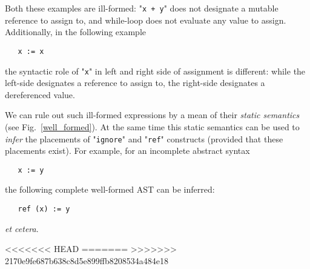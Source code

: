 \documentclass{article}
\newcommand{\llang}[1]{\mbox{\lstinline[mathescape]|#1|}}
\newcommand{\primi}[2]{\mathbf{#1}\;{#2}}
\theoremstyle{definition}
\begin{document}
Both these examples are ill-formed: "\llang{x + y}" does not designate a mutable reference to assign to, and while-loop does not
evaluate any value to assign. Additionally, in the following example

\begin{lstlisting}
   x := x
\end{lstlisting}

the syntactic role of "\llang{x}" in left and right side of assignment is different: while the left-side designates a reference to assign to,
the right-side designates a dereferenced value.

We can rule out such ill-formed expressions by a mean of their \emph{static semantics} (see Fig.~\ref{well_formed}). At the same time this static
semantics can be used to \emph{infer} the placements of "\llang{ignore}" and "\llang{ref}" constructs (provided that these placements exist). For example,
for an incomplete abstract syntax

\begin{lstlisting}
   x := y
\end{lstlisting}

the following complete well-formed AST can be inferred:

\begin{lstlisting}
   ref (x) := y
\end{lstlisting}

\emph{et cetera}.

<<<<<<< HEAD
\newcommand{\Ref}{\primi{Ref}{}}
=======
\renewcommand{\Ref}{\primi{Ref}{}}
>>>>>>> 2170e9fe687b638c8d5e899ffb8208534a484e18
\newcommand{\Val}{\primi{Val}{}}
\newcommand{\Void}{\primi{Void}{}}
\end{document}
